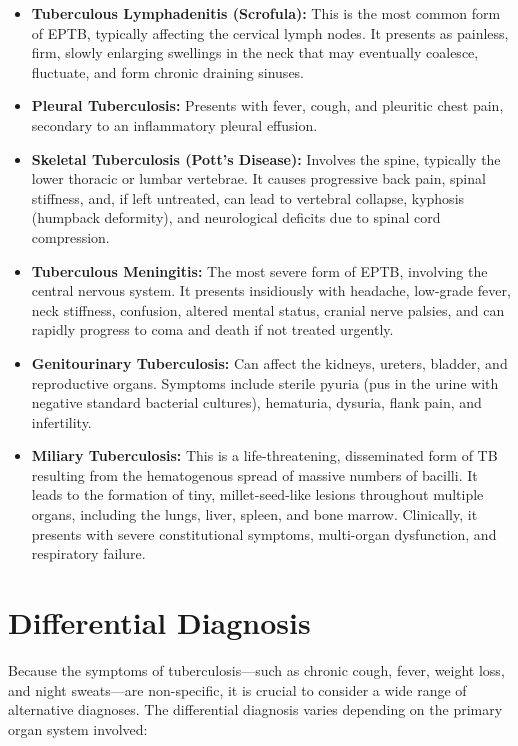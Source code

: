 \begin{itemize}
    \item \textbf{Tuberculous Lymphadenitis (Scrofula):} This is the most common form of EPTB, typically affecting the cervical lymph nodes. It presents as painless, firm, slowly enlarging swellings in the neck that may eventually coalesce, fluctuate, and form chronic draining sinuses.
    \item \textbf{Pleural Tuberculosis:} Presents with fever, cough, and pleuritic chest pain, secondary to an inflammatory pleural effusion.
    \item \textbf{Skeletal Tuberculosis (Pott's Disease):} Involves the spine, typically the lower thoracic or lumbar vertebrae. It causes progressive back pain, spinal stiffness, and, if left untreated, can lead to vertebral collapse, kyphosis (humpback deformity), and neurological deficits due to spinal cord compression.
    \item \textbf{Tuberculous Meningitis:} The most severe form of EPTB, involving the central nervous system. It presents insidiously with headache, low-grade fever, neck stiffness, confusion, altered mental status, cranial nerve palsies, and can rapidly progress to coma and death if not treated urgently.
    \item \textbf{Genitourinary Tuberculosis:} Can affect the kidneys, ureters, bladder, and reproductive organs. Symptoms include sterile pyuria (pus in the urine with negative standard bacterial cultures), hematuria, dysuria, flank pain, and infertility.
    \item \textbf{Miliary Tuberculosis:} This is a life-threatening, disseminated form of TB resulting from the hematogenous spread of massive numbers of bacilli. It leads to the formation of tiny, millet-seed-like lesions throughout multiple organs, including the lungs, liver, spleen, and bone marrow. Clinically, it presents with severe constitutional symptoms, multi-organ dysfunction, and respiratory failure.
\end{itemize}

\section*{Differential Diagnosis}
Because the symptoms of tuberculosis---such as chronic cough, fever, weight loss, and night sweats---are non-specific, it is crucial to consider a wide range of alternative diagnoses. The differential diagnosis varies depending on the primary organ system involved:

